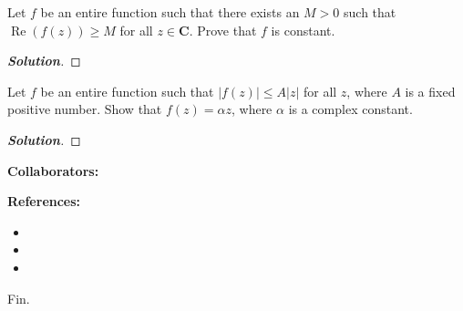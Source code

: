 \documentclass[11pt]{article}
\newenvironment{problem}[2][Problem\!]{\begin{trivlist}
\item[\hskip \labelsep {\bfseries #1}\hskip \labelsep {\bfseries #2.}]}{\end{trivlist}}
\newenvironment{solution}{\begin{proof}[\textbf{\textit{Solution}}]}{\end{proof}}
\newcommand{\cc}{\mathbf C}   %
\newcommand{\abs}[1]{\left\lvert#1\right\rvert} %
\renewcommand{\geq}{\geqslant}
\renewcommand{\leq}{\leqslant}
\renewcommand{\Re}{\operatorname{Re}}
\begin{document}
\newpage  %

\begin{problem}{8.4}
Let $f$ be an entire function such that there exists an $M > 0$ such that $\Re(f(z)) \geq M$ for all $z \in \cc$. Prove that $f$ is constant. 
\end{problem}
\begin{solution}
\end{solution}

\newpage  %

\begin{problem}{8.5}
Let $f$ be an entire function such that $\abs{f(z)} \leq A\abs{z}$ for all $z$, where $A$ is a fixed positive number. Show that $f(z) = \alpha z$, where $\alpha$ is a complex constant.
\end{problem}
\begin{solution}
\end{solution}


\newpage  %

\begin{center}
\textbf{Collaborators:}
\end{center}
\vfill 

\begin{center}
\textbf{References:}
\end{center}
\begin{itemize}
\item[$\bullet$] [Book(s): Title, Author]
\item[$\bullet$] [Online: \href{http://example.com/}{\color{blue}Link}]
\item[$\bullet$] [Notes: \href{http://example.com/}{\color{blue}Link}]
\end{itemize}

\vfill
\begin{center}
Fin.
\end{center}
\vfill
\end{document}
